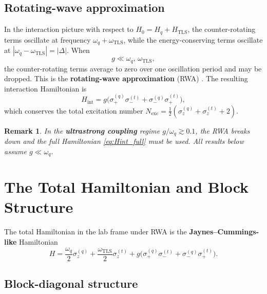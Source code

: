 \documentclass[12pt,a4paper]{article}
\newcommand{\wq}{\omega_q}
\newcommand{\wt}{\omega_{\mathrm{TLS}}}
\newcommand{\D}{\Delta}
\newcommand{\smq}{\sigma_-^{(q)}}
\newcommand{\spq}{\sigma_+^{(q)}}
\newcommand{\smt}{\sigma_-^{(t)}}
\newcommand{\spt}{\sigma_+^{(t)}}
\newcommand{\szq}{\sigma_z^{(q)}}
\newcommand{\szt}{\sigma_z^{(t)}}
\newtheorem{remark}{Remark}
\begin{document}
\subsection{Rotating-wave approximation}

In the interaction picture with respect to $H_0 = H_q + H_{\mathrm{TLS}}$,
the counter-rotating terms oscillate at frequency $\wq + \wt$, while the
energy-conserving terms oscillate at $|\wq - \wt| = |\D|$.
When
\begin{equation}
  g \ll \wq,\,\wt,
  \label{eq:RWA_condition}
\end{equation}
the counter-rotating terms average to zero over one oscillation period and
may be dropped. This is the \textbf{rotating-wave approximation} (RWA)
\cite{Haroche2006,WallsMilburn2008}. The resulting interaction Hamiltonian is
\begin{equation}
  \boxed{
  H_{\mathrm{int}} = g\bigl(\spq\smt + \smq\spt\bigr),
  }
  \label{eq:Hint_RWA}
\end{equation}
which conserves the total excitation number
$N_{\mathrm{exc}} = \frac{1}{2}(\szq + \szt + 2)$.

\begin{remark}
  In the \textbf{ultrastrong coupling} regime $g/\wq \gtrsim 0.1$, the RWA
  breaks down and the full Hamiltonian \eqref{eq:Hint_full} must be used.
  All results below assume $g \ll \wq$.
\end{remark}

\section{The Total Hamiltonian and Block Structure}

The total Hamiltonian in the lab frame under RWA is the
\textbf{Jaynes--Cummings-like} Hamiltonian \cite{Blais2021,Ashhab2006}
\begin{equation}
  \boxed{
  H = \frac{\wq}{2}\szq + \frac{\wt}{2}\szt
    + g\bigl(\spq\smt + \smq\spt\bigr).
  }
  \label{eq:H_total}
\end{equation}

\subsection{Block-diagonal structure}
\end{document}
